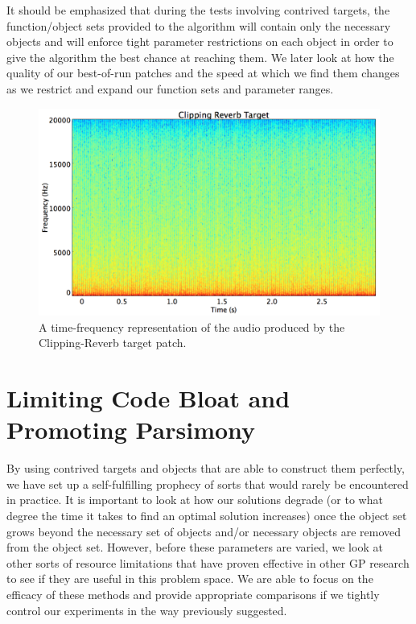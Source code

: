 \documentclass[12pt]{report} 	%
\numberwithin{figure}{chapter}
\numberwithin{table}{chapter}
\numberwithin{equation}{chapter}
\begin{document}
\begin{flushleft}
It should be emphasized that during the tests involving contrived targets, the function/object sets provided to the algorithm will contain only the necessary objects and will enforce tight parameter restrictions on each object in order to give the algorithm the best chance at reaching them. We later look at how the quality of our best-of-run patches and the speed at which we find them changes as we restrict and expand our function sets and parameter ranges.
\clearpage
\begin{figure}[h!]
\begin{center}
\includegraphics[scale=0.35,width=\linewidth]{ClippingReverbTargetSTFT}
\caption[Clipping reverb sawtooth time-frequency representation]{A time-frequency representation of the audio produced by the Clipping-Reverb target patch.}
\end{center}
\end{figure}

\section{Limiting Code Bloat and Promoting Parsimony}
By using contrived targets and objects that are able to construct them perfectly, we have set up a self-fulfilling prophecy of sorts that would rarely be encountered in practice. It is important to look at how our solutions degrade (or to what degree the time it takes to find an optimal solution increases) once the object set grows beyond the necessary set of objects and/or necessary objects are removed from the object set. However, before these parameters are varied, we look at other sorts of resource limitations that have proven effective in other GP research to see if they are useful in this problem space. We are able to focus on the efficacy of these methods and provide appropriate comparisons if we tightly control our experiments in the way previously suggested.


\end{flushleft}
\end{document}
